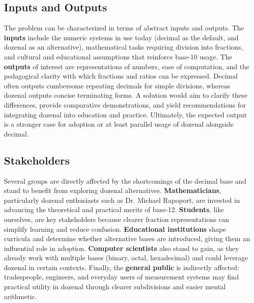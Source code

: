 \documentclass{article}
\begin{document}
    \subsection{Inputs and Outputs}
    The problem can be characterized in terms of abstract inputs and outputs. The 
    \textbf{inputs} include the numeric systems in use today (decimal as the default, 
    and dozenal as an alternative), mathematical tasks requiring division into 
    fractions, and cultural and educational assumptions that reinforce base-10 usage. 
    The \textbf{outputs} of interest are representations of numbers, ease of computation, 
    and the pedagogical clarity with which fractions and ratios can be expressed. 
    Decimal often outputs cumbersome repeating decimals for simple divisions, whereas 
    dozenal outputs concise terminating forms. A solution would aim to clarify these 
    differences, provide comparative demonstrations, and yield recommendations for 
    integrating dozenal into education and practice. Ultimately, the expected output 
    is a stronger case for adoption or at least parallel usage of dozenal alongside decimal.

    \subsection{Stakeholders}
    Several groups are directly affected by the shortcomings of the decimal base and 
    stand to benefit from exploring dozenal alternatives. \textbf{Mathematicians}, 
    particularly dozenal enthusiasts such as Dr. Michael Rapoport, are invested in 
    advancing the theoretical and practical merits of base-12. \textbf{Students}, like 
    ourselves, are key stakeholders because clearer fraction representations can simplify 
    learning and reduce confusion. \textbf{Educational institutions} shape curricula 
    and determine whether alternative bases are introduced, giving them an influential 
    role in adoption. \textbf{Computer scientists} also stand to gain, as they already 
    work with multiple bases (binary, octal, hexadecimal) and could leverage dozenal in 
    certain contexts. Finally, the \textbf{general public} is indirectly affected: 
    tradespeople, engineers, and everyday users of measurement systems may find practical 
    utility in dozenal through clearer subdivisions and easier mental arithmetic.
\end{document}
